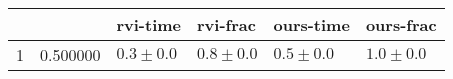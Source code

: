 \begin{tabular}{llllll}
\toprule
 &  & rvi-time & rvi-frac & ours-time & ours-frac \\
\midrule
1 & 0.500000 & $0.3 \pm 0.0$ & $0.8 \pm 0.0$ & $0.5 \pm 0.0$ & $1.0 \pm 0.0$ \\
\cline{1-6}
\bottomrule
\end{tabular}
